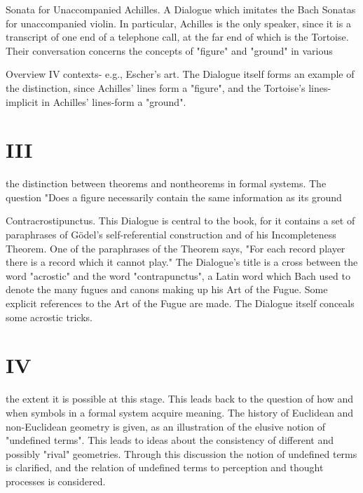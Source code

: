 Sonata for Unaccompanied Achilles. A Dialogue which imitates the Bach Sonatas for unaccompanied violin. In particular, Achilles is the only speaker, since it is a transcript of one end of a telephone call, at the far end of which is the Tortoise. Their conversation concerns the concepts of "figure" and "ground" in various 







Overview                                                                                          IV contexts- e.g., Escher's art. The Dialogue itself forms an example of the distinction, since Achilles' lines form a "figure", and the Tortoise's lines-implicit in Achilles' lines-form a "ground". 


\chapter {III}
the distinction between theorems and nontheorems in formal systems. The question "Does a figure necessarily contain the same information as its ground%

Contracrostipunctus. This Dialogue is central to the book, for it contains a set of paraphrases of Gödel’s self-referential construction and of his Incompleteness Theorem. One of the paraphrases of the Theorem says, "For each record player there is a record which it cannot play." The Dialogue's title is a cross between the word "acrostic" and the word "contrapunctus", a Latin word which Bach used to denote the many fugues and canons making up his Art of the Fugue. Some explicit references to the Art of the Fugue are made. The Dialogue itself conceals some acrostic tricks. 


\chapter {IV}
the extent it is possible at this stage. This leads back to the question of how and when symbols in a formal system acquire meaning. The history of Euclidean and non-Euclidean geometry is given, as an illustration of the elusive notion of "undefined terms". This leads to ideas about the consistency of different and possibly "rival" geometries. Through this discussion the notion of undefined terms is clarified, and the relation of undefined terms to perception and thought processes is considered. 

